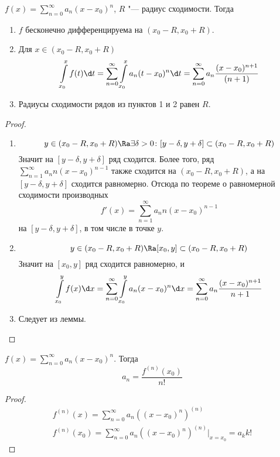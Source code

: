 \begin{theorem}
	$f(x) = \sum_{n=0}^\infty a_n(x-x_0)^n$, $R$ "--- радиус сходимости.
	Тогда
	\begin{enumerate}
	\item
		$f$ бесконечно дифференцируема на $(x_0 - R, x_0 + R)$.

	\item
		Для $x \in (x_0 - R, x_0 + R)$
		\[
			\int\limits_{x_0}^x f(t) \d t
			= \sum_{n=0}^\infty \int\limits_{x_0}^x a_n(t-x_0)^n \d t
			= \sum_{n=0}^\infty a_n \frac{(x-x_0)^{n+1}}{(n+1)}
		\]

	\item
		Радиусы сходимости рядов из пунктов 1 и 2 равен $R$.
	\end{enumerate}
\end{theorem}
\begin{proof}
	\begin{enumerate}
	\item
		\[ y \in (x_0 - R, x_0 + R) \Ra \exists \delta > 0\colon [y-\delta, y+\delta] \subset (x_0 - R, x_0 + R) \]
		Значит на $[y-\delta, y+\delta]$ ряд сходится.
		Более того, ряд $\sum_{n=1}^\infty a_n n (x-x_0)^{n-1}$ также сходится на $(x_0 - R, x_0 + R)$,
		а на $[y-\delta, y+\delta]$ сходится равномерно.
		Отсюда по теореме о равномерной сходимости производных
		\[ f'(x) = \sum_{n=1}^\infty a_n n (x-x_0)^{n-1} \]
		на $[y-\delta, y+\delta]$, в том числе в точке $y$.

	\item
		\[ y \in (x_0 - R, x_0 + R) \Ra [x_0, y] \subset (x_0 - R, x_0 + R) \]
		Значит на $[x_0, y]$ ряд сходится равномерно, и
		\[
			\int\limits_{x_0}^y f(x) \d x
			= \sum_{n=0}^\infty \int\limits_{x_0}^y a_n(x-x_0)^n \d x
			= \sum_{n=0}^\infty a_n \frac{(x-x_0)^{n+1}}{n+1}
		\]

	\item
		Следует из леммы.
	\end{enumerate}
\end{proof}

\begin{theorem}
	$f(x) = \sum_{n=0}^\infty a_n(x-x_0)^n$.
	Тогда
	\[ a_n = \frac{f^{(n)}(x_0)}{n!} \]
\end{theorem}
\begin{proof}
	\begin{gather*}
		f^{(n)}(x) = \sum_{n=0}^\infty a_n \left( (x-x_0)^n \right)^{(n)} \\
		f^{(n)}(x_0) = \sum_{n=0}^\infty a_n \left( (x-x_0)^n \right)^{(n)} \biggr|_{x=x_0} = a_k k!
	\end{gather*}
\end{proof}

